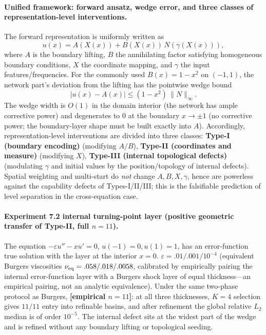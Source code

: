 \documentclass[11pt]{article}
\numberwithin{equation}{section}
\begin{document}
\paragraph{Unified framework: forward ansatz, wedge error, and three classes of representation-level interventions.} The forward representation is uniformly written as
\[
u(x)=A(X(x))+B(X(x))\,N(\gamma(X(x))),
\]
where $A$ is the boundary lifting, $B$ the annihilating factor satisfying homogeneous boundary conditions, $X$ the coordinate mapping, and $\gamma$ the input features/frequencies. For the commonly used $B(x)=1-x^2$ on $(-1,1)$, the network part's deviation from the lifting has the pointwise wedge bound
\begin{equation}\label{eq:wedge}
|u(x)-A(x)|\le (1-x^2)\,\|N\|_\infty .
\end{equation}
The wedge width is $O(1)$ in the domain interior (the network has ample corrective power) and degenerates to $0$ at the boundary $x\to\pm1$ (no corrective power; the boundary-layer shape must be built exactly into $A$). Accordingly, representation-level interventions are divided into three classes: \textbf{Type-I (boundary encoding)} (modifying $A/B$), \textbf{Type-II (coordinates and measure)} (modifying $X$), \textbf{Type-III (internal topological defects)} (modulating $\gamma$ and initial values by the position/topology of internal defects). Spatial weighting and multi-start do \emph{not} change $A,B,X,\gamma$, hence are powerless against the capability defects of Types-I/II/III; this is the falsifiable prediction of level separation in the cross-equation case.

\paragraph{Experiment 7.2 internal turning-point layer (positive geometric transfer of Type-II, full $n=11$).} The equation $-\varepsilon u''-xu'=0$, $u(-1)=0,u(1)=1$, has an error-function true solution with the layer at the interior $x=0$. $\varepsilon=.01/.001/10^{-4}$ (equivalent Burgers viscosities $\nu_{\rm eq}=.058/.018/.0058$, calibrated by empirically pairing the internal error-function layer with a Burgers shock layer of equal thickness---an empirical pairing, not an analytic equivalence). Under the same two-phase protocol as Burgers, \textbf{[empirical $n=11$]}: at all three thicknesses, $K=4$ selection gives $11/11$ entry into refinable basins, and after refinement the global relative $L_2$ median is of order $10^{-5}$. The internal defect sits at the widest part of the wedge and is refined without any boundary lifting or topological seeding.
\end{document}
